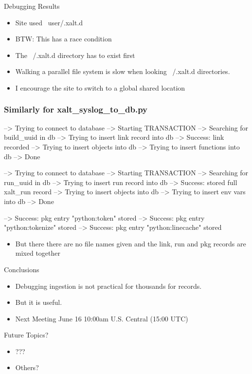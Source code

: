 \documentclass{beamer}
\begin{document}
\begin{frame}{Debugging Results}
  \begin{itemize}
    \item Site used ~user/.xalt.d
    \item BTW: This has a race condition 
    \item The ~/.xalt.d directory has to exist first
    \item Walking a parallel file system is slow when looking
      ~/.xalt.d directories.
    \item I encourage the site to switch to a global shared location
  \end{itemize}
\end{frame}

\begin{frame}[fragile]
    \frametitle{Similarly for xalt\_syslog\_to\_db.py}
 {\tiny
    \begin{semiverbatim}
  --> Trying to connect to database
  --> Starting TRANSACTION
  --> Searching for build_uuid in db
  --> Trying to insert link record into db
  --> Success: link recorded
  --> Trying to insert objects into db
  --> Trying to insert functions into db
  --> Done

  --> Trying to connect to database
  --> Starting TRANSACTION
  --> Searching for run_uuid in db
  --> Trying to insert run record into db
  --> Success: stored full xalt_run record
  --> Trying to insert objects into db
  --> Trying to insert env vars into db
  --> Done

  --> Success: pkg entry "python:token" stored
  --> Success: pkg entry "python:tokenize" stored
  --> Success: pkg entry "python:linecache" stored
    \end{semiverbatim}
}
  \begin{itemize}
    \item  But there there are no file names given and the link, run and pkg
  records are mixed together
  \end{itemize}

\end{frame}


\begin{frame}{Conclusions}
  \begin{itemize}
    \item Debugging ingestion is not practical for thousands for
      records.
    \item But it is useful.
    \item Next Meeting June 16 10:00am U.S. Central (15:00 UTC)
  \end{itemize}
\end{frame}


\begin{frame}{Future Topics?}
  \begin{itemize}
    \item ???
    \item Others?
  \end{itemize}
\end{frame}
%

%
\end{document}

